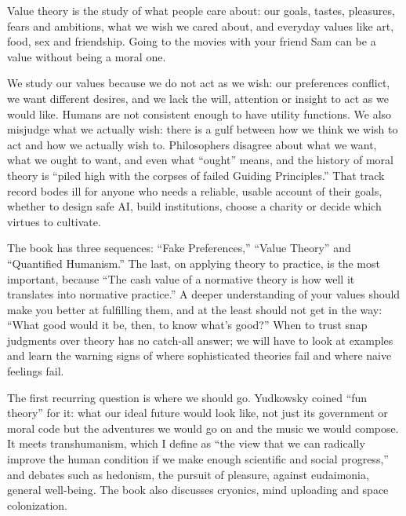 
Value theory is the study of what people care about: our goals, tastes, pleasures, fears and ambitions, what we wish we cared about, and everyday values like art, food, sex and friendship. Going to the movies with your friend Sam can be a value without being a moral one. 

We study our values because we do not act as we wish: our preferences conflict, we want different desires, and we lack the will, attention or insight to act as we would like. Humans are not consistent enough to have utility functions.  We also misjudge what we actually wish: there is a gulf between how we think we wish to act and how we actually wish to. Philosophers disagree about what we want, what we ought to want, and even what ``ought'' means, and the history of moral theory is ``piled high with the corpses of failed Guiding Principles.'' That track record bodes ill for anyone who needs a reliable, usable account of their goals, whether to design safe AI, build institutions, choose a charity or decide which virtues to cultivate. 

The book has three sequences: ``Fake Preferences,'' ``Value Theory'' and ``Quantified Humanism.'' The last, on applying theory to practice, is the most important, because ``The cash value of a normative theory is how well it translates into normative practice.''  A deeper understanding of your values should make you better at fulfilling them, and at the least should not get in the way: ``What good would it be, then, to know what's good?'' When to trust snap judgments over theory has no catch-all answer; we will have to look at examples and learn the warning signs of where sophisticated theories fail and where naive feelings fail.

The first recurring question is where we should go. Yudkowsky coined ``fun theory'' for it: what our ideal future would look like, not just its government or moral code but the adventures we would go on and the music we would compose. It meets transhumanism, which I define as ``the view that we can radically improve the human condition if we make enough scientific and social progress,'' and debates such as hedonism, the pursuit of pleasure, against eudaimonia, general well-being. The book also discusses cryonics, mind uploading and space colonization. 


